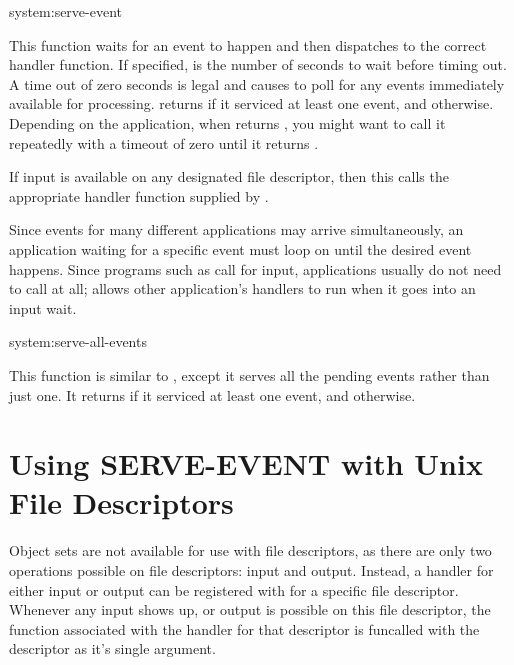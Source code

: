 \begin{defun}{system:}{serve-event}{}
  
  This function waits for an event to happen and then dispatches to
  the correct handler function.  If specified,  is the
  number of seconds to wait before timing out.  A time out of zero
  seconds is legal and causes  to poll for
  any events immediately available for processing.
   returns \true{} if it serviced at least
  one event, and \nil{} otherwise.  Depending on the application, when
   returns \true, you might want to call it
  repeatedly with a timeout of zero until it returns \nil.
  
  If input is available on any designated file descriptor, then this
  calls the appropriate handler function supplied by
  .
  
  Since events for many different applications may arrive
  simultaneously, an application waiting for a specific event must
  loop on  until the desired event happens.
  Since programs such as \hemlock{} call  for
  input, applications usually do not need to call
   at all; \hemlock{} allows other
  application's handlers to run when it goes into an input wait.
\end{defun}

\begin{defun}{system:}{serve-all-events}{}
  
  This function is similar to , except it
  serves all the pending events rather than just one.  It returns
  \true{} if it serviced at least one event, and \nil{} otherwise.
\end{defun}


\section{Using SERVE-EVENT with Unix File Descriptors}

Object sets are not available for use with file descriptors, as there are
only two operations possible on file descriptors: input and output.
Instead, a handler for either input or output can be registered with
 for a specific file descriptor.  Whenever any input
shows up, or output is possible on this file descriptor, the function
associated with the handler for that descriptor is funcalled with the
descriptor as it's single argument.

